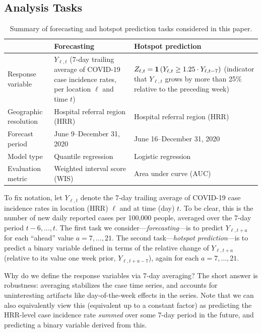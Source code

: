 \documentclass[9pt,twocolumn,twoside,lineno]{pnas-new}
\begin{document}
\subsection{Analysis Tasks}

\begin{table}[t]
\centering
\caption{Summary of forecasting and hotspot prediction tasks considered in
  this paper.}
\begin{tabular}{l p{2.75in} p{2.75in}}
  \toprule
  & \textbf{Forecasting} & \textbf{Hotspot prediction} \\
  \midrule
  Response variable & $Y_{\ell,t}$ (7-day trailing average of COVID-19 case 
incidence rates, per location $\ell$ and time $t$) & $Z_{\ell,t} =
\mathbf{1}\left(Y_{\ell,t} \geq 1.25 \cdot Y_{\ell,t-7}\right)$ (indicator that 
$Y_{\ell,t}$ grows by more than 25\% relative to the preceding week) \\ 
  Geographic resolution & Hospital referral region (HRR) & Hospital referral
region (HRR) \\ 
  Forecast period & June 9--December 31, 2020 & June 16--December 31, 2020 \\  
  Model type & Quantile regression & Logistic regression \\
  Evaluation metric & Weighted interval score (WIS) & Area under curve (AUC) \\
  \bottomrule
\end{tabular}
\label{tab:analysis_tasks}
\end{table}

To fix notation, let $Y_{\ell,t}$ denote the 7-day trailing average of COVID-19
case incidence rates in location (HRR) $\ell$ and at time (day) $t$.  To be
clear, this is the number of new daily reported cases per 100,000
people, averaged over the 7-day period $t-6, \ldots, t$. The first task we
consider---\textit{forecasting}---is to predict $Y_{\ell,t+a}$ for each
``ahead'' value $a=7,\ldots,21$.  The second task---\textit{hotspot
  prediction}---is to predict a binary variable defined in terms of the relative
change of $Y_{\ell,t+a}$ (relative to its value one week prior,
$Y_{\ell,t+a-7}$), again for each $a=7,\ldots,21$.   

Why do we define the response variables via 7-day averaging? The short answer 
is robustness: averaging stabilizes the case time series, and accounts for 
uninteresting artifacts like day-of-the-week effects in the series.  Note that
we can also equivalently view this (equivalent up to a constant factor) as
predicting the HRR-level case incidence rate \textit{summed} over some 7-day
period in the future, and predicting a binary variable derived from this.     
\end{document}
